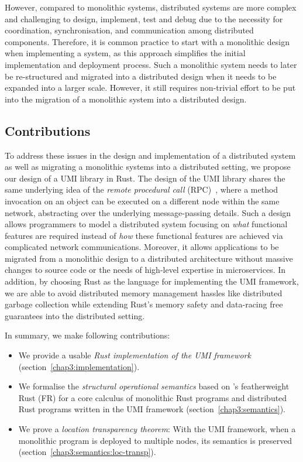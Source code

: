However, compared to monolithic systems, distributed systems are more complex and challenging to design, implement, test and debug due to the necessity for coordination, synchronisation, and communication among distributed components. Therefore, it is common practice to start with a monolithic design when implementing a system, as this approach simplifies the initial implementation and deployment process. Such a monolithic system needs to later be re-structured and migrated into a distributed design when it needs to be expanded into a larger scale. However, it still requires non-trivial effort to be put into the migration of a monolithic system into a distributed design.

\subsection{Contributions}
To address these issues in the design and implementation of a distributed system as well as migrating a monolithic systems into a distributed setting, we propose our design of a UMI library in Rust. The design of the UMI library shares the same underlying idea of the \emph{remote procedural call} (RPC)~\citep{10.5555/910306}, where a method invocation on an object can be executed on a different node within the same network, abstracting over the underlying message-passing details. Such a design allows programmers to model a distributed system focusing on \emph{what} functional features are required instead of \emph{how} these functional features are achieved via complicated network communications. Moreover, it allows applications to be migrated from a monolithic design to a distributed architecture without massive changes to source code or the needs of high-level expertise in microservices. In addition, by choosing Rust as the language for implementing the UMI framework, we are able to avoid distributed memory management hassles like distributed garbage collection while extending Rust's memory safety and data-racing free guarantees into the distributed setting.

In summary, we make following contributions:
\begin{itemize}
    \item We provide a usable \emph{Rust implementation of the UMI framework} (section~\ref{chap3:implementation}).
    \item We formalise the \emph{structural operational semantics} based on \citet{10.1145/3443420}'s featherweight Rust (FR) for a core calculus of monolithic Rust programs and distributed Rust programs written in the UMI framework (section~\ref{chap3:semantics}).
    \item We prove a \emph{location transparency theorem}: With the UMI framework, when a monolithic program is deployed to multiple nodes, its semantics is preserved (section~\ref{chap3:semantics:loc-transp}).
\end{itemize}

